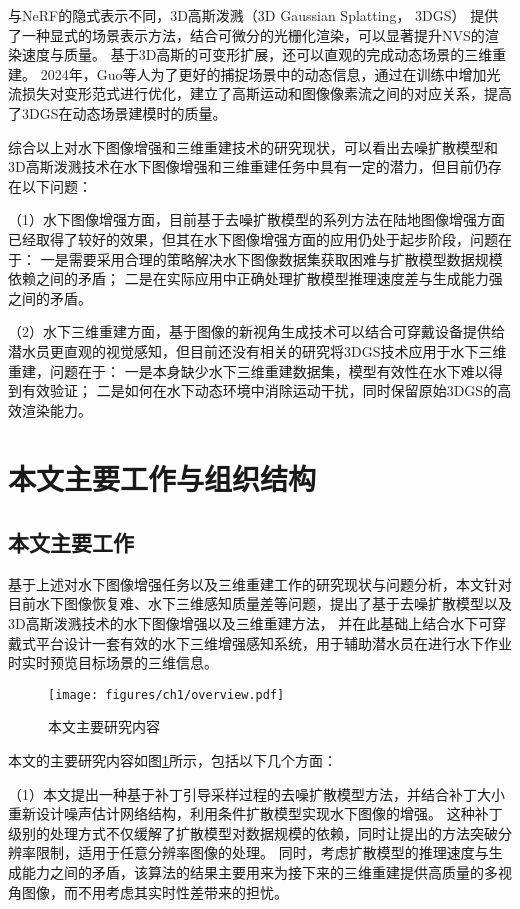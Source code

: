 与NeRF的隐式表示不同，3D高斯泼溅（3D Gaussian Splatting， 3DGS） \cite{3DGS} 提供了一种显式的场景表示方法，结合可微分的光栅化渲染，可以显著提升NVS的渲染速度与质量。
基于3D高斯的可变形扩展\cite{dynamic_3DGS1}\cite{dynamic_3DGS2}\cite{dynamic_3DGS_efficient}\cite{4DGS}，还可以直观的完成动态场景的三维重建。
2024年，Guo等人\cite{flow_2024motion}为了更好的捕捉场景中的动态信息，通过在训练中增加光流损失对变形范式进行优化，建立了高斯运动和图像像素流之间的对应关系，提高了3DGS在动态场景建模时的质量。

综合以上对水下图像增强和三维重建技术的研究现状，可以看出去噪扩散模型和3D高斯泼溅技术在水下图像增强和三维重建任务中具有一定的潜力，但目前仍存在以下问题：

（1）水下图像增强方面，目前基于去噪扩散模型的系列方法在陆地图像增强方面已经取得了较好的效果，但其在水下图像增强方面的应用仍处于起步阶段，问题在于：
一是需要采用合理的策略解决水下图像数据集获取困难与扩散模型数据规模依赖之间的矛盾；
二是在实际应用中正确处理扩散模型推理速度差与生成能力强之间的矛盾。

（2）水下三维重建方面，基于图像的新视角生成技术可以结合可穿戴设备提供给潜水员更直观的视觉感知，但目前还没有相关的研究将3DGS技术应用于水下三维重建，问题在于：
一是本身缺少水下三维重建数据集，模型有效性在水下难以得到有效验证；
二是如何在水下动态环境中消除运动干扰，同时保留原始3DGS的高效渲染能力。


\section{本文主要工作与组织结构}
\subsection{本文主要工作}
基于上述对水下图像增强任务以及三维重建工作的研究现状与问题分析，本文针对目前水下图像恢复难、水下三维感知质量差等问题，提出了基于去噪扩散模型以及3D高斯泼溅技术的水下图像增强以及三维重建方法，
并在此基础上结合水下可穿戴式平台设计一套有效的水下三维增强感知系统，用于辅助潜水员在进行水下作业时实时预览目标场景的三维信息。
\begin{figure}
    \centering
    \texttt{[image: figures/ch1/overview.pdf]}
    \caption{本文主要研究内容}
    \label{img:overview}
\end{figure}

本文的主要研究内容如图\ref{img:overview}所示，包括以下几个方面：

（1）本文提出一种基于补丁引导采样过程的去噪扩散模型方法，并结合补丁大小重新设计噪声估计网络结构，利用条件扩散模型实现水下图像的增强。
这种补丁级别的处理方式不仅缓解了扩散模型对数据规模的依赖，同时让提出的方法突破分辨率限制，适用于任意分辨率图像的处理。
同时，考虑扩散模型的推理速度与生成能力之间的矛盾，该算法的结果主要用来为接下来的三维重建提供高质量的多视角图像，而不用考虑其实时性差带来的担忧。

